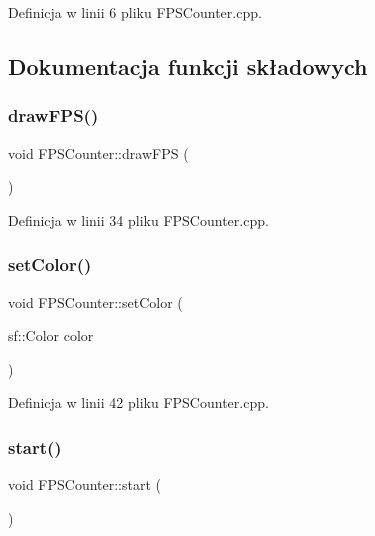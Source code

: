 Definicja w linii 6 pliku F\+P\+S\+Counter.\+cpp.



\subsection{Dokumentacja funkcji składowych}
\mbox{\label{class_f_p_s_counter_a7415ae4bb4094b4809627caf5e40d8f1}} 
\subsubsection{\texorpdfstring{draw\+F\+P\+S()}{drawFPS()}}
{\footnotesize\ttfamily void F\+P\+S\+Counter\+::draw\+F\+PS (\begin{DoxyParamCaption}{ }\end{DoxyParamCaption})}



Definicja w linii 34 pliku F\+P\+S\+Counter.\+cpp.

\mbox{\label{class_f_p_s_counter_a57be5e95f140cb230f3f4e11ca476857}} 
\subsubsection{\texorpdfstring{set\+Color()}{setColor()}}
{\footnotesize\ttfamily void F\+P\+S\+Counter\+::set\+Color (\begin{DoxyParamCaption}\item[{sf\+::\+Color}]{color }\end{DoxyParamCaption})}



Definicja w linii 42 pliku F\+P\+S\+Counter.\+cpp.

\mbox{\label{class_f_p_s_counter_abba94df2064bfa561ef9d1a3e11929a5}} 
\subsubsection{\texorpdfstring{start()}{start()}}
{\footnotesize\ttfamily void F\+P\+S\+Counter\+::start (\begin{DoxyParamCaption}{ }\end{DoxyParamCaption})}



